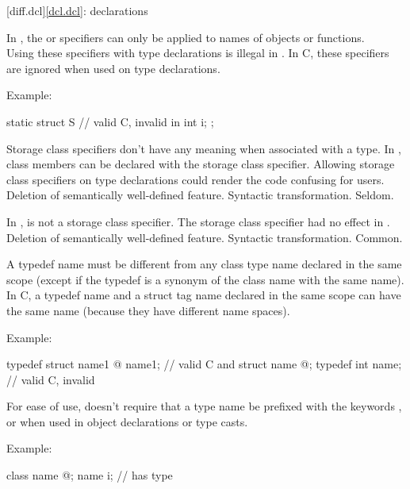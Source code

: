 [diff.dcl]{\ref{dcl.dcl}: declarations}

\change
In \Cpp{}, the  or  specifiers can only be applied to names of objects or functions.\\
Using these specifiers with type declarations is illegal in \Cpp{}.
In C, these specifiers are ignored when used on type declarations.

Example:
\begin{codeblock}
static struct S {               // valid C, invalid in \Cpp{}
  int i;
};
\end{codeblock}

\rationale
Storage class specifiers don't have any meaning when associated
with a type.
In \Cpp{}, class members can be declared with the  storage
class specifier.
Allowing storage class specifiers on type
declarations could render the code confusing for users.
\effect
Deletion of semantically well-defined feature.
\difficulty
Syntactic transformation.
\howwide
Seldom.

\change
In \Cpp{},  is not a storage class specifier.
\rationale
The storage class specifier had no effect in \Cpp{}.
\effect
Deletion of semantically well-defined feature.
\difficulty
Syntactic transformation.
\howwide
Common.

\change
A \Cpp{} typedef name must be different from any class type name declared
in the same scope (except if the typedef is a synonym of the class name with the
same name). In C, a typedef name and a struct tag name declared in the same scope
can have the same name (because they have different name spaces).

Example:
\begin{codeblock}
typedef struct name1 { @\commentellip@ } name1;         // valid C and \Cpp{}
struct name { @\commentellip@ };
typedef int name;               // valid C, invalid \Cpp{}
\end{codeblock}

\rationale
For ease of use, \Cpp{} doesn't require that a type name be prefixed
with the keywords ,  or  when used in object
declarations or type casts.

Example:
\begin{codeblock}
class name { @\commentellip@ };
name i;                         //  has type 
\end{codeblock}


